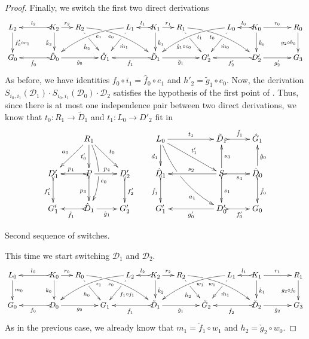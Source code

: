 \documentclass[a4paper,UKenglish,cleveref,pdftex,thm-restate,numberwithinsect]{lipics-v2021}
\def\G{\textbf {\textup{G}}}
\newcommand{\dder}[1]{\mathscr{#1}}
\begin{document}
\begin{proof}
	Finally, we switch the first two direct derivations
	\[\xymatrix@C=15pt{L_2\ar[d]^{f'_0\circ c_1}&& K_2 \ar[d]_{\hat{k}_2}\ar@{>->}[ll]_{l_2} \ar[r]^{r_2} & R_2 \ar@/^.35cm/[drrr]_(.4){e_0}|(.29)\hole \ar[dr]|(.28)\hole_{\hat{h}_2} && L_1 \ar@/_.35cm/[dlll]^(.4){e_1} \ar[dl]|(.28)\hole^{\hat{m}_1}& K_1 \ar[d]^{\hat{k}_1}\ar@{>->}[l]_{l_1} \ar[r]^{r_1} & R_1 \ar@/^.35cm/[drrr]_(.4){t_0}|(.29)\hole \ar[dr]|(.28)\hole_{\hat{g}_1\circ c_0}   && L_0  \ar[dl]|(.28)\hole^{\hat{m}_0} \ar@/_.35cm/[dlll]^(.4){t_1}& K_0 \ar[d]^{\hat{k}_0}\ar@{>->}[l]_{l_0} \ar[rr]^{r_0} && R_0 \ar[d]_{g_2\circ b_0} \\G_0 && \ar@{>->}[ll]^{\hat{f}_0} \hat{D}_0 \ar[rr]_{\hat{g}_0}&& \hat{G}_1  && \ar@{>->}[ll]^{\tilde{f}_1} \tilde{D}_1 \ar[rr]_{\tilde{g}_1}&& G'_2 && \ar@{>->}[ll]^{f'_2} D'_2 \ar[rr]_{g'_2}&& G_3 }\]
	As before, we have identities $f_0\circ i_1=\hat{f}_0\circ e_1$ and $h'_2=\tilde{g}_1\circ e_0$. Now, the derivation $S_{i_0, i_1}(\dder{D}_1)\cdot S_{i_0, i_1}(\dder{D}_0)\cdot \dder{D}_2$ satisfies the hypothesis of the first point of . Thus, since there is at most one independence pair between two direct derivations, we know that  $t_0\colon R_1\to \tilde{D}_1$ and $t_1\colon L_0\to D'_2$  fit in
	\[\xymatrix{&R_1 \ar[dl]_{a_0} \ar@{>}[dr]^{t_0} \ar@/^.4cm/[dd]|\hole^(.6){c_0}\ar[d]_{t'_0}&&L_ 0\ar[d]_{d_1} \ar@/_.4cm/[ddrr]|(.41)\hole_(.7){a_1}\ar[drr]^{t'_1} \ar@{>}[rr]^{t_1}&&\tilde{D}_1 \ar@{>->}[r]^{\tilde{f}_1}&\hat{G}_1\\ D'_1 \ar@{>->}[d]_{f'_1}&P\ar@{>->}[d]_{p_3} \ar[r]^{p_4} \ar@{>->}[l]_{p_1}&D'_2\ar@{>->}[d]^{f'_2}&\hat{D}_1 \ar@{>->}[d]_{\hat{f}_1}&&S\ar@{>->}[r]_{s_4} \ar[u]_{s_3}\ar@{>->}[d]^{s_1} \ar[ll]_{s_2} &\hat{D}_0 \ar[u]_{\hat{g}_0} \ar@{>->}[d]^{\hat{f}_0}\\G'_1&\hat{D}_1 \ar@{>->}[l]^{\hat{f}_1}\ar[r]_{\hat{g}_1}& G'_2&G'_1 && D'_0 \ar[ll]^{g'_0}  \ar@{>->}[r]_{f'_0}& G_0 }\]
	
	\smallskip \noindent Second sequence of switches.
	
	This time we start switching $\dder{D}_1$ and $\dder{D}_2$.
	\[\xymatrix@C=15pt{L_0\ar[d]^{m_0}&& K_0 \ar[d]_{k_0}\ar@{>->}[ll]_{l_0} \ar[r]^{r_0} & R_0 \ar@/^.35cm/[drrr]_(.4){z_0}|(.29)\hole \ar[dr]|(.28)\hole_{h_0} && L_2 \ar@/_.35cm/[dlll]^(.4){z_1} \ar[dl]|(.28)\hole^{f_1\circ j_1}& K_2 \ar[d]^{\check{k}_2}\ar@{>->}[l]_{l_2} \ar[r]^{r_2} & R_2 \ar[dr]|(.28)\hole_{\check{h}_2} \ar@/^.35cm/[drrr]_(.4){w_0}|(.29)\hole  && L_1 \ar@/_.35cm/[dlll]^(.4){w_1} \ar[dl]|(.28)\hole^{\check{m}_1}& K_1 \ar[d]^{\check{k}_1}\ar@{>->}[l]_{l_1} \ar[rr]^{r_1} && R_1\ar[d]_{g_2\circ j_0} \\G_0 && \ar@{>->}[ll]^{f_0} D_0 \ar[rr]_{g_0}&& G_1  && \ar@{>->}[ll]^{\check{f}_1} \check{D}_1 \ar[rr]_{\check{g}_1}&& \check{G}_2 && \ar@{>->}[ll]^{\check{f}_2} \check{D}_2 \ar[rr]_{\check{g}_2}&& G_3 }\]
	As in the previous case, we already know that $m_1=\check{f}_1\circ w_1$ and $h_2=\check{g}_2\circ w_0$.
	

\end{proof}
\end{document}
